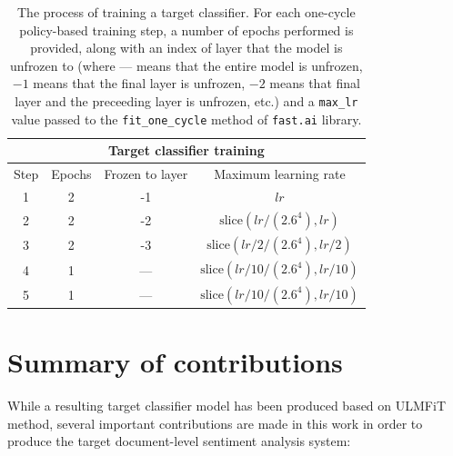 \begin{table}[ht]
\centering
\begin{tabular}{ cccc }
\toprule
\multicolumn{4}{c}{Target classifier training} \\ \midrule
Step & Epochs & Frozen to layer & Maximum learning rate \\ \midrule
1 & 2 & -1 & $lr$ \\
2 & 2 & -2 & $\mathrm{slice}(lr/(2.6^4), lr)$ \\
3 & 2 & -3 & $\mathrm{slice}(lr/2/(2.6^4), lr/2)$ \\
4 & 1 & --- & $\mathrm{slice}(lr/10/(2.6^4), lr/10)$ \\
5 & 1 & --- & $\mathrm{slice}(lr/10/(2.6^4), lr/10)$ \\
\bottomrule
\end{tabular}
\caption{The process of training a target classifier. For each one-cycle policy-based training step, a number of epochs performed is provided, along with an index of layer that the model is unfrozen to (where --- means that the entire model is unfrozen, $-1$ means that the final layer is unfrozen, $-2$ means that final layer and the preceeding layer is unfrozen, etc.) and a \lstinline{max_lr} value passed to the \lstinline{fit_one_cycle} method of \lstinline{fast.ai} library.}
\label{our:classifier}
\end{table}

\section{Summary of contributions}

While a resulting target classifier model has been produced based on ULMFiT method, several important contributions are made in this work in order to produce the target document-level sentiment analysis system:

